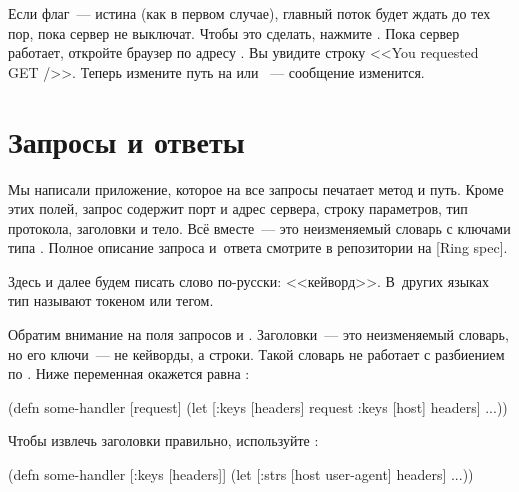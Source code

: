 \fi

Если флаг~--- истина (как в первом случае), главный поток будет ждать до тех
пор, пока сервер не выключат. Чтобы это сделать, нажмите . Пока
сервер работает, откройте браузер по адресу . Вы
увидите строку <<You requested GET />>. Теперь измените путь на 
или ~--- сообщение изменится.

\section{Запросы и ответы}

Мы написали приложение, которое на все запросы печатает метод и путь. Кроме этих
полей, запрос содержит порт и адрес сервера, строку параметров, тип протокола,
заголовки и тело. Всё вместе~--- это неизменяемый словарь с ключами типа
. Полное описание запроса и~ответа смотрите в репозитории на
[Ring spec].

Здесь и далее будем писать слово  по-русски:
<<кейворд>>. В~других языках тип называют токеном или тегом.


Обратим внимание на поля запросов  и . Заголовки~---
это неизменяемый словарь, но его ключи~--- не кейворды, а строки. Такой словарь не
работает с разбиением по . Ниже переменная  окажется
равна :


\begin{clojure}
(defn some-handler
  [request]
  (let [{:keys [headers]} request
        {:keys [host]} headers]
    ...))
\end{clojure}


Чтобы извлечь заголовки правильно, используйте :

\ifafive\vspace{15mm}\pagebreak[4]\fi

\ifnarrow

\begin{clojure}
(defn some-handler
  [{:keys [headers]}]
  (let [{:strs [host
                user-agent]} headers]
    ...))
\end{clojure}

\else

